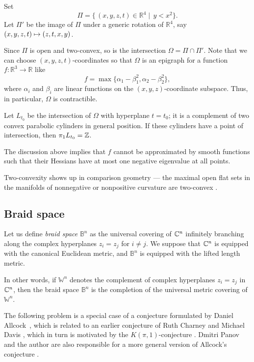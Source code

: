 Set
$$\Pi=\{\,(x,y,z,t)\in\mathbb R^4\mid\,y< x^2\}.$$
Let $\Pi'$ be the image of $\Pi$ under a generic rotation of $\mathbb R^4$,
say $(x,y,z,t)\z\mapsto(z,t,x,y)$.

Since $\Pi$ is open and two-convex, so is the intersection $\Omega=\Pi\cap \Pi'$.
Note that we can choose $(x,y,z,t)$-coordinates so that $\Omega$ is an epigraph for a function $f\colon\mathbb R^3\to\mathbb R$ like
$$f=\max\{\alpha_1-\beta_1^2,\alpha_2-\beta_2^2 \},$$
where $\alpha_i$ and $\beta_i$ are linear functions on the $(x,y,z)$-coordinate subspace.
Thus, in particular, $\Omega$ is contractible.

Let $L_{t_0}$ be the intersection of $\Omega$ with hyperplane $t=t_0$;
it is a complement of two convex parabolic cylinders in general position.
If these cylinders have a point of intersection, then $\pi_1 L_{t_0}\z=\mathbb Z$.

The discussion above implies that $f$ cannot be approximated by smooth functions such that their Hessians have at most one negative eigenvalue at all points.

Two-convexity shows up in comparison geometry --- the maximal open flat sets in the manifolds of nonnegative or nonpositive curvature are two-convex \cite{panov-petrunin}.

\subsection{Braid space}

Let us define \emph{braid space} $\mathbb{B}^n$ as the universal covering of $\mathbb{C}^n$ infinitely branching along the complex hyperplanes $z_i=z_j$ for $i\ne j$.
We suppose that $\mathbb{C}^n$ is equipped with the canonical Euclidean metric,
and $\mathbb{B}^n$ is equipped with the lifted length metric.

In other words, if $\mathbb{W}^n$ denotes the complement of complex hyperplanes $z_i=z_j$ in $\mathbb{C}^n$,
then the braid space $\mathbb{B}^n$ is the completion of the universal metric covering of $\mathbb{W}^n$.

The following problem is a special case of a conjecture formulated by Daniel Allcock~\cite[Conjecture 1.4]{allcock}, which is related to an earlier conjecture of Ruth Charney and Michael Davis \cite[Conjecture 3]{charney-davis-95}, which in turn is motivated by the $K(\pi,1)$-conjecture \cite{vanderlek,paris}.
Dmitri Panov and the author are also responsible for a more general version of Allcock's conjecture \cite[Conjecture 1.1]{panov-petrunin}.

